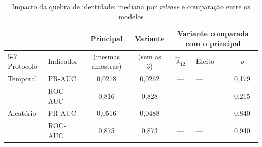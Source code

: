 \begin{table}[htbp]
    
    \centering
    \footnotesize
    \setlength{\tabcolsep}{4pt}%
    \caption{Impacto da quebra de identidade: mediana por \textit{release} e comparação entre os modelos}
    \label{tab:res-sens-teste}
    \begin{tabular}{llccclc}
        \toprule
         & & Principal & Variante & \multicolumn{3}{c}{Variante comparada com o principal} \\
        \cmidrule(lr){5-7}
        Protocolo & Indicador & (mesmas amostras) & (sem as 3) & $\hat{A}_{12}$ & Efeito & $p$ \\
        \midrule
        Temporal & PR-AUC & 0,0218 & 0,0262 & --- & --- & 0,179 \\
         & ROC-AUC & 0,816 & 0,828 & --- & --- & 0,215 \\
        \midrule
        Aleatório & PR-AUC & 0,0516 & 0,0488 & --- & --- & 0,840 \\
         & ROC-AUC & 0,875 & 0,873 & --- & --- & 0,940 \\
        \bottomrule
    \end{tabular}
\end{table}%
